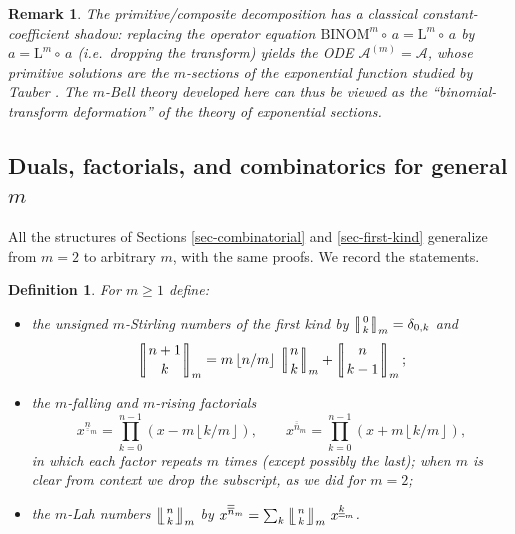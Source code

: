 \documentclass[a4paper]{amsart}
\numberwithin{equation}{section}
\newcommand{\mStirlingone}[2]{\left[\mkern-3.8mu\middle|\genfrac{}{}{0pt}{}{#1}{#2}\middle|\mkern-3.8mu\right]}
\newcommand{\mLah}[2]{\left\lfloor\mkern-5.5mu\left\lfloor\genfrac{}{}{0pt}{}{#1}{#2}\right\rfloor\mkern-5.5mu\right\rfloor}
\newcommand{\uuline}[1]{\underline{\underline{#1}}}
\newcommand{\ooline}[1]{\overline{\overline{#1}}}
\newcommand{\floor}[1]{\left\lfloor #1 \right\rfloor}
\newtheorem{definition}[theorem]{Definition}
\newtheorem{remark}[theorem]{Remark}
\begin{document}
\begin{remark}
The primitive/composite decomposition has a classical constant-coefficient shadow: replacing the operator equation $\mathrm{BINOM}^m \circ\, a = \mathrm{L}^m \circ\, a$ by $a = \mathrm{L}^m \circ\, a$ (i.e.\ dropping the transform) yields the ODE $\mathcal{A}^{(m)} = \mathcal{A}$, whose primitive solutions are the $m$-sections of the exponential function studied by Tauber \cite{tauberGeneralizationsExponentialFunction1960}. The $m$-Bell theory developed here can thus be viewed as the ``binomial-transform deformation'' of the theory of exponential sections.
\end{remark}

\subsection{Duals, factorials, and combinatorics for general $m$}

All the structures of Sections \ref{sec-combinatorial} and \ref{sec-first-kind} generalize from $m = 2$ to arbitrary $m$, with the same proofs. We record the statements.

\begin{definition}\label{def-general-duals}
For $m \geq 1$ define:
\begin{itemize}
    \item[(i)] the unsigned \emph{$m$-Stirling numbers of the first kind} by $\mStirlingone{0}{k}_m = \delta_{0,k}$ and
    \[
    \mStirlingone{n+1}{k}_m = m\floor{n/m}\,\mStirlingone{n}{k}_m + \mStirlingone{n}{k-1}_m;
    \]
    \item[(ii)] the \emph{$m$-falling and $m$-rising factorials}
    \[
    x^{\uuline{n}_m} = \prod_{k=0}^{n-1}\left(x - m\floor{k/m}\right), \qquad
    x^{\ooline{n}_m} = \prod_{k=0}^{n-1}\left(x + m\floor{k/m}\right),
    \]
    in which each factor repeats $m$ times (except possibly the last); when $m$ is clear from context we drop the subscript, as we did for $m=2$;
    \item[(iii)] the \emph{$m$-Lah numbers} $\mLah{n}{k}_m$ by $x^{\ooline{n}_m} = \sum_k \mLah{n}{k}_m\, x^{\uuline{k}_m}$.
\end{itemize}
\end{definition}
\end{document}
